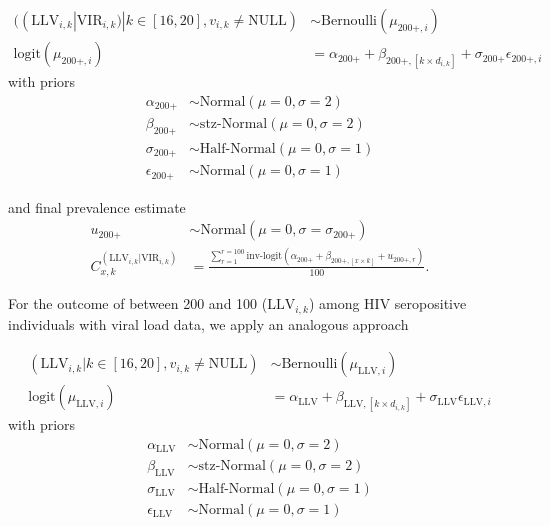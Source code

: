 \documentclass{article}[11pt]
\begin{document}
\begin{equation}
\begin{split}
((\text{LLV}_{i,k}|\text{VIR}_{i,k}) | k \in [16,20], v_{i,k} \neq \text{NULL}) &\sim \text{Bernoulli}(\mu_{\text{200+},i}) \\
\text{logit}(\mu_{\text{200+},i}) &= \alpha_{\text{200+}} + \beta_{\text{200+},[k \times d_{i,k}]} + \sigma_\text{200+}\epsilon_{\text{200+},i}
\end{split}
\end{equation}
with priors
\begin{equation}
\begin{split}
\alpha_\text{200+} &\sim \text{Normal}(\mu=0,\sigma=2) \\
\beta_\text{200+} &\sim \text{stz-Normal}(\mu=0,\sigma=2) \\
\sigma_\text{200+} &\sim \text{Half-Normal}(\mu=0,\sigma=1)\\
\epsilon_\text{200+} &\sim \text{Normal}(\mu=0,\sigma=1)
\end{split}
\end{equation}

and final prevalence estimate
\begin{equation}
\begin{split}
u_\text{200+} &\sim \text{Normal}(\mu=0,\sigma=\sigma_\text{200+}) \\
C^{(\text{LLV}_{i,k}|\text{VIR}_{i,k})}_{x,k} &= \frac{\sum_{r=1}^{r=100}\text{inv-logit}\left(\alpha_\text{200+} + \beta_{\text{200+},[x\times k]} + u_{\text{200+},r}\right)}{100}.
\end{split}
\end{equation}

For the outcome of between 200 and 100 ($\text{LLV}_{i,k}$) among HIV seropositive individuals with viral load data, we apply an analogous approach

\begin{equation}
\begin{split}
(\text{LLV}_{i,k} | k \in [16,20], v_{i,k} \neq \text{NULL}) &\sim \text{Bernoulli}(\mu_{\text{LLV},i}) \\
\text{logit}(\mu_{\text{LLV},i}) &= \alpha_{\text{LLV}} + \beta_{\text{LLV},[k \times d_{i,k}]} + \sigma_\text{LLV}\epsilon_{\text{LLV},i}
\end{split}
\end{equation}
with priors
\begin{equation}
\begin{split}
\alpha_\text{LLV} &\sim \text{Normal}(\mu=0,\sigma=2) \\
\beta_\text{LLV} &\sim \text{stz-Normal}(\mu=0,\sigma=2) \\
\sigma_\text{LLV} &\sim \text{Half-Normal}(\mu=0,\sigma=1)\\
\epsilon_\text{LLV} &\sim \text{Normal}(\mu=0,\sigma=1) 
\end{split}
\end{equation}
\end{document}
